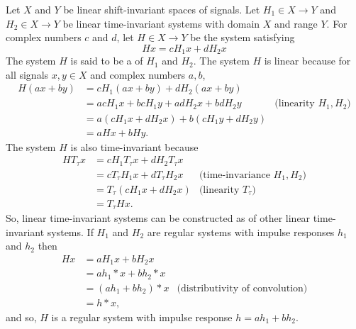
Let $X$ and $Y$ be linear shift-invariant spaces of signals.  Let $H_1 \in X \to Y$ and $H_2 \in X \to Y$ be linear time-invariant systems with domain $X$ and range $Y$.  For complex numbers $c$ and $d$, let $H \in X \to Y$ be the system satisfying
\[
Hx = cH_1x + dH_2x
\]
The system $H$ is said to be a  of $H_1$ and $H_2$.  The system $H$ is linear because for all signals $x,y \in X$ and complex numbers $a,b$,
\begin{align*}
H(ax + by) &= cH_1(ax+by) + dH_2(ax+by) \\
&= acH_1 x +bcH_1y + adH_2x+ bdH_2y & \text{(linearity $H_1, H_2$)} \\
&= a ( cH_1x  + dH_2x ) + b ( cH_1y + dH_2y ) \\
&= aHx + bHy.
\end{align*}
The system $H$ is also time-invariant because
\begin{align*}
HT_\tau x &= cH_1T_\tau x + dH_2T_\tau x  \\
&= c T_\tau H_1 x + dT_\tau H_2 x & \text{(time-invariance $H_1,H_2$)} \\
&= T_\tau( cH_1 x + dH_2 x ) & \text{(linearity $T_\tau$)} \\
&= T_\tau H x.
\end{align*}
So, linear time-invariant systems can be constructed as  of other linear time-invariant systems.  If $H_1$ and $H_2$ are regular systems with impulse responses $h_1$ and $h_2$ then
\begin{align*}
Hx &= a H_1 x + b H_2 x \\
&= a h_1 * x + b h_2 * x \\
&= (a h_1 + bh_2) * x &\text{(distributivity of convolution)}\\
&= h * x,
\end{align*}
and so, $H$ is a regular system with impulse response $h = ah_1 + bh_2$.  %

